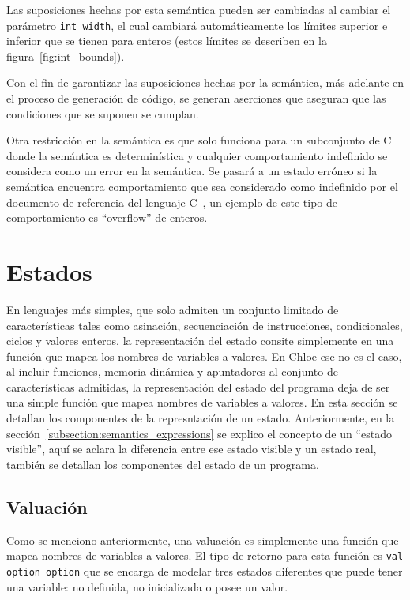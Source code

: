 Las suposiciones hechas por esta semántica pueden ser cambiadas al cambiar el parámetro \verb|int_width|, el cual cambiará automáticamente los límites superior e inferior que se tienen para enteros (estos límites se describen en la figura~\ref{fig:int_bounds}).

Con el fin de garantizar las suposiciones hechas por la semántica, más adelante en el proceso de generación de código, se generan aserciones que aseguran que las condiciones que se suponen se cumplan.

Otra restricción en la semántica es que solo funciona para un subconjunto de C donde la semántica es determinística y cualquier comportamiento indefinido se considera como un error en la semántica.
Se pasará a un estado erróneo si la semántica encuentra comportamiento que sea considerado como indefinido por el documento de referencia del lenguaje C~\cite{c99}, un ejemplo de este tipo de comportamiento es ``overflow'' de enteros.


\section{Estados}\label{section:states}

En lenguajes más simples, que solo admiten un conjunto limitado de características tales como asinación, secuenciación de instrucciones, condicionales, ciclos y valores enteros, la representación del estado consite simplemente en una función que mapea los nombres de variables a valores.
En Chloe ese no es el caso, al incluir funciones, memoria dinámica y apuntadores al conjunto de características admitidas, la representación del estado del programa deja de ser una simple función que mapea nombres de variables a valores.
En esta sección se detallan los componentes de la represntación de un estado.
Anteriormente, en la sección~\ref{subsection:semantics_expressions} se explico el concepto de un ``estado visible'', aquí se aclara la diferencia entre ese estado visible y un estado real, también se detallan los componentes del estado de un programa.

\subsection{Valuación}\label{subsection:valuation}

Como se menciono anteriormente, una valuación es simplemente una función que mapea nombres de variables a valores.
El tipo de retorno para esta función es \verb|val option option| que se encarga de modelar tres estados diferentes que puede tener una variable: no definida, no inicializada o posee un valor.


